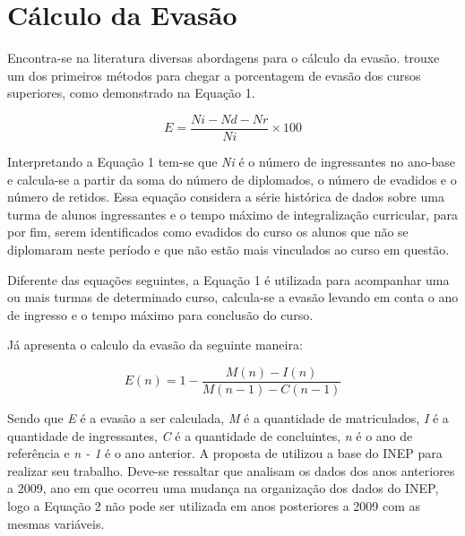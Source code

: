 \section{Cálculo da Evasão}\label{sec:CalculoEvasao}
Encontra-se na literatura diversas abordagens para o cálculo da evasão.  trouxe um dos primeiros métodos para chegar a porcentagem de evasão dos cursos superiores, como demonstrado na Equação 1.

\renewcommand{\theequation}{Eq. \arabic{equation}} 
\begin{equation}\label{eq:mec}
E = \frac{Ni - Nd - Nr}{Ni}\times{100}
\end{equation}

Interpretando a Equação 1 tem-se que \textit{Ni} é o número de ingressantes no ano-base e calcula-se a partir da soma do número de diplomados, o número de evadidos e o número de retidos. Essa equação considera a série histórica de dados sobre uma turma de alunos ingressantes e o tempo máximo de integralização curricular, para por fim, serem identificados como evadidos do curso os alunos que não se
diplomaram neste período e que não estão mais vinculados ao curso em questão. 

Diferente das equações seguintes, a Equação 1 é utilizada para acompanhar uma ou mais turmas de determinado curso, calcula-se a evasão levando em conta o ano de ingresso e o tempo máximo para conclusão do curso.


Já  apresenta o calculo da evasão da seguinte maneira: 

\begin{equation}\label{eq:evasaovelha}
E(n) = 1 - \frac{M(n) - I(n)}{M(n - 1) - C(n - 1)}
\end{equation}


Sendo que \textit{E} é a evasão a ser calculada, \textit{M} é a quantidade de matriculados, \textit{I} é a quantidade de ingressantes, \textit{C} é a quantidade de concluintes, \textit{n} é o ano de referência e \textit{n - 1} é o ano anterior. A proposta de  utilizou a base do INEP para realizar seu trabalho. Deve-se ressaltar que  analisam os dados dos anos anteriores a 2009, ano em que ocorreu uma mudança na organização dos dados do INEP, logo a Equação 2 não pode ser utilizada em anos posteriores a 2009 com as mesmas variáveis.

